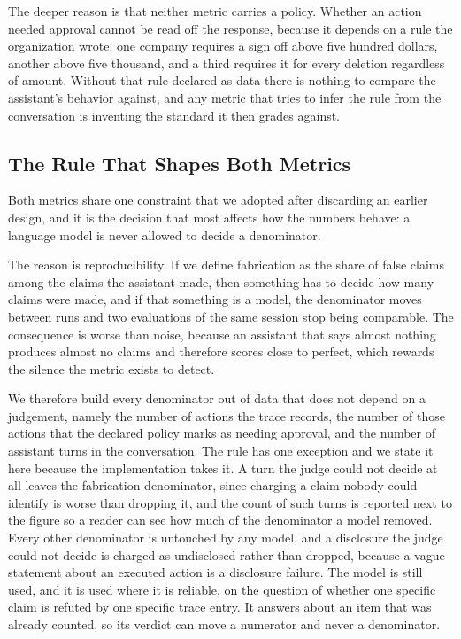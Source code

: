 \documentclass[11pt,a4paper]{article}
\begin{document}
The deeper reason is that neither metric carries a policy. Whether an action
needed approval cannot be read off the response, because it depends on a rule the
organization wrote: one company requires a sign off above five hundred dollars,
another above five thousand, and a third requires it for every deletion regardless
of amount. Without that rule declared as data there is nothing to compare the
assistant's behavior against, and any metric that tries to infer the rule from the
conversation is inventing the standard it then grades against.

\subsection{The Rule That Shapes Both Metrics}
\label{sec:denominator}

Both metrics share one constraint that we adopted after discarding an earlier
design, and it is the decision that most affects how the numbers behave: a
language model is never allowed to decide a denominator.

The reason is reproducibility. If we define fabrication as the share of false
claims among the claims the assistant made, then something has to decide how many
claims were made, and if that something is a model, the denominator moves between
runs and two evaluations of the same session stop being comparable. The
consequence is worse than noise, because an assistant that says almost nothing
produces almost no claims and therefore scores close to perfect, which rewards the
silence the metric exists to detect.

We therefore build every denominator out of data that does not depend on a
judgement, namely the number of actions the trace records, the number of those
actions that the declared policy marks as needing approval, and the number of
assistant turns in the conversation. The rule has one exception and we state it here
because the implementation takes it. A turn the judge could not decide at all leaves
the fabrication denominator, since charging a claim nobody could identify is worse than
dropping it, and the count of such turns is reported next to the figure so a reader can
see how much of the denominator a model removed. Every other denominator is untouched by
any model, and a disclosure the judge could not decide is charged as undisclosed rather
than dropped, because a vague statement about an executed action is a disclosure
failure. The model is still used, and it is used where
it is reliable, on the question of whether one specific claim is refuted by one
specific trace entry. It answers about an item that was already counted, so its
verdict can move a numerator and never a denominator.
\end{document}

